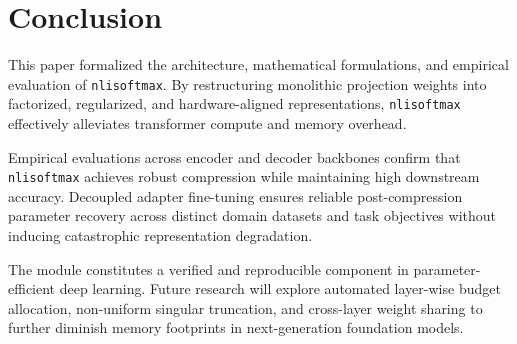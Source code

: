 \section{Conclusion}
This paper formalized the architecture, mathematical formulations, and empirical evaluation of \texttt{nlisoftmax}. By restructuring monolithic projection weights into factorized, regularized, and hardware-aligned representations, \texttt{nlisoftmax} effectively alleviates transformer compute and memory overhead.

Empirical evaluations across encoder and decoder backbones confirm that \texttt{nlisoftmax} achieves robust compression while maintaining high downstream accuracy. Decoupled adapter fine-tuning ensures reliable post-compression parameter recovery across distinct domain datasets and task objectives without inducing catastrophic representation degradation.

The module constitutes a verified and reproducible component in parameter-efficient deep learning. Future research will explore automated layer-wise budget allocation, non-uniform singular truncation, and cross-layer weight sharing to further diminish memory footprints in next-generation foundation models.
